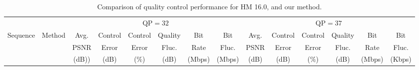\documentclass[smallabstract,smallcaptions]{dccpaper}
\begin{document}
\begin{table}[tp]
\begin{center}
\caption{\label{result}%
\footnotesize{Comparison of quality control performance for HM 16.0, \cite{seo2013rate} and our method.}}
{
\renewcommand{\baselinestretch}{1}\footnotesize
\tiny{
\begin{tabular}{|c|c|c|c|c|c|c|c|c|c|c|c|c|c|}

\hline

\multicolumn{1}{|c|}{~} &
\multicolumn{1}{c|}{~} &
\multicolumn{6}{c|}{$\mathrm{QP}=32$} &
\multicolumn{6}{c|}{$\mathrm{QP}=37$} \\

\cline{3-14}

\multicolumn{1}{|c|}{Sequence} &
\multicolumn{1}{c|}{Method} &
\multicolumn{1}{c|}{Avg.} &
\multicolumn{1}{c|}{Control} &
\multicolumn{1}{c|}{Control} &
\multicolumn{1}{c|}{Quality} &
\multicolumn{1}{c|}{Bit} &
\multicolumn{1}{c|}{Bit} &
\multicolumn{1}{c|}{Avg.} &
\multicolumn{1}{c|}{Control} &
\multicolumn{1}{c|}{Control} &
\multicolumn{1}{c|}{Quality} &
\multicolumn{1}{c|}{Bit} &
\multicolumn{1}{c|}{Bit} \\

\multicolumn{1}{|c|}{~} &
\multicolumn{1}{c|}{~} &
\multicolumn{1}{c|}{PSNR} &
\multicolumn{1}{c|}{Error} &
\multicolumn{1}{c|}{Error} &
\multicolumn{1}{c|}{Fluc.} &
\multicolumn{1}{c|}{Rate} &
\multicolumn{1}{c|}{Fluc.} &
\multicolumn{1}{c|}{PSNR} &
\multicolumn{1}{c|}{Error} &
\multicolumn{1}{c|}{Error} &
\multicolumn{1}{c|}{Fluc.} &
\multicolumn{1}{c|}{Rate} &
\multicolumn{1}{c|}{Fluc.} \\

\multicolumn{1}{|c|}{~} &
\multicolumn{1}{c|}{~} &
\multicolumn{1}{c|}{(dB))} &
\multicolumn{1}{c|}{(dB)} &
\multicolumn{1}{c|}{(\%)} &
\multicolumn{1}{c|}{(dB)} &
\multicolumn{1}{c|}{(Mbps)} &
\multicolumn{1}{c|}{(Mbps)} &
\multicolumn{1}{c|}{(dB)} &
\multicolumn{1}{c|}{(dB)} &
\multicolumn{1}{c|}{(\%)} &
\multicolumn{1}{c|}{(dB)} &
\multicolumn{1}{c|}{(Mbps)} &
\multicolumn{1}{c|}{(Kbps)} \\
\hline


\end{tabular}}}
\end{center}
\end{table}
\end{document}
